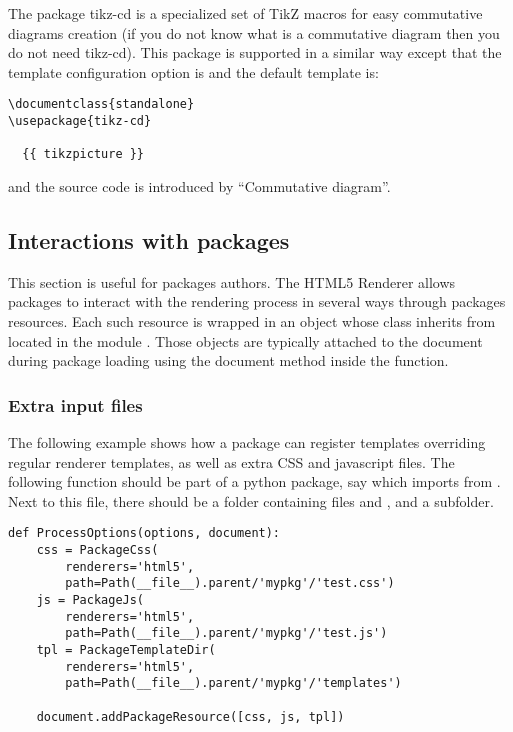 The package tikz-cd is a specialized set of TikZ macros for easy commutative
diagrams creation (if you do not know what is a commutative diagram then
you do not need tikz-cd). This package is supported in a similar way
except that the template configuration option is
 and the default template is:
\begin{verbatim}
\documentclass{standalone}
\usepackage{tikz-cd}

  {{ tikzpicture }}

\end{verbatim}
and the source code is introduced by ``Commutative diagram''.

\subsection{Interactions with packages}\label{sec:html5-pkg}

This section is useful for packages authors. The HTML5 Renderer allows
packages to interact with the rendering process in several ways through
packages resources. Each such resource is wrapped in an object whose
class inherits from  located in the module
. Those objects are typically attached to
the document during package loading using the document
 method inside the 
function.

\subsubsection*{Extra input files}

The following example shows how a package can register templates
overriding regular renderer templates, as well as extra CSS and
javascript files.
The following function should be part of a python package, say
 which imports  from .
Next to this file, there should be a
folder  containing files  and ,
and a  subfolder.

\begin{verbatim}
def ProcessOptions(options, document):
    css = PackageCss(
        renderers='html5',
        path=Path(__file__).parent/'mypkg'/'test.css')
    js = PackageJs(
        renderers='html5',
        path=Path(__file__).parent/'mypkg'/'test.js')
    tpl = PackageTemplateDir(
        renderers='html5',
        path=Path(__file__).parent/'mypkg'/'templates')

    document.addPackageResource([css, js, tpl])
\end{verbatim}

